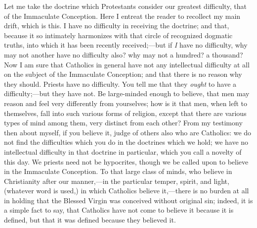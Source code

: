 Let me take the doctrine which Protestants consider our greatest
difficulty, that of the Immaculate Conception. Here I entreat the reader
to recollect my main drift, which is this. I have no difficulty in
receiving the doctrine; and that, because it so intimately
harmonizes with that circle of recognized dogmatic truths, into which it
has been recently received;—but if \emph{I} have no difficulty, why
may not another have no difficulty also? why may not a hundred? a
thousand? Now I am sure that Catholics in general have not any
intellectual difficulty at all on the subject of the Immaculate
Conception; and that there is no reason why they should. Priests have no
difficulty. You tell me that they \emph{ought} to have a difficulty;—but
they have not. Be large-minded enough to believe, that men may reason
and feel very differently from yourselves; how is it that men,
when left to themselves, fall into such various forms of
religion, except that there are various types of mind among them, very
distinct from each other? From my testimony then about myself, if you
believe it, judge of others also who are Catholics: we do not find the
difficulties which you do in the doctrines which we hold; we have no
intellectual difficulty in that doctrine in particular, which
you call a novelty of this day. We priests need not be hypocrites,
though we be called upon to believe in the Immaculate Conception. To
that large class of minds, who believe in Christianity after our
manner,—in the particular temper, spirit, and light, (whatever word is
used,) in which Catholics believe it,—there is no burden at all in
holding that the Blessed Virgin was conceived without original sin;
indeed, it is a simple fact to say, that Catholics have not come to
believe it because it is defined, but that it was defined
because they believed it.

